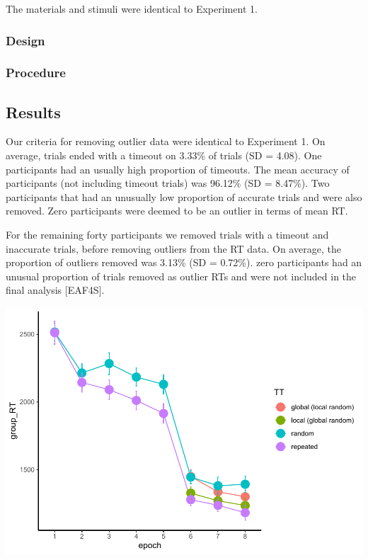 \documentclass[
  man]{apa6}
\begin{document}
The materials and stimuli were identical to Experiment 1.

\hypertarget{design-2}{%
\subsubsection{Design}\label{design-2}}

\hypertarget{procedure-2}{%
\subsubsection{Procedure}\label{procedure-2}}

\hypertarget{results-2}{%
\subsection{Results}\label{results-2}}

Our criteria for removing outlier data were identical to Experiment 1. On average, trials ended with a timeout on 3.33\% of trials (SD = 4.08). One participants had an usually high proportion of timeouts. The mean accuracy of participants (not including timeout trials) was 96.12\% (SD = 8.47\%). Two participants that had an unusually low proportion of accurate trials and were also removed. Zero participants were deemed to be an outlier in terms of mean RT.

For the remaining forty participants we removed trials with a timeout and inaccurate trials, before removing outliers from the RT data. On average, the proportion of outliers removed was 3.13\% (SD = 0.72\%). zero participants had an unusual proportion of trials removed as outlier RTs and were not included in the final analysis {[}EAF4S{]}.

\includegraphics{CCC_ms1_files/figure-latex/unnamed-chunk-17-1.pdf}
\end{document}
